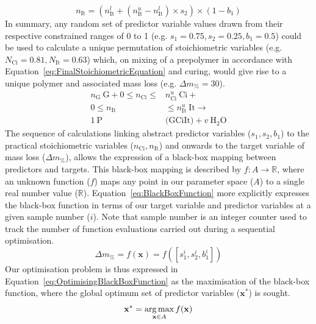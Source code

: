 \begin{equation}\label{eq:ItaconicAcidStoichiometricPredictorLink}
    n_{\text{It}}=(n_{\text{It}}^{l}+(n_{\text{It}}^{u}-n_{\text{It}}^{l})\times s_{2})\times (1-b_{1})
\end{equation}
In summary, any random set of predictor variable values drawn from their
 respective constrained ranges of 0 to 1
 (e.g. \(s_{1}=0.75,s_{2}=0.25,b_{1}=0.5\)) could be used to calculate a
 unique permutation of stoichiometric variables (e.g. 
 \(N_{\text{Ci}}=0.81,N_{\text{It}}=0.63\)) which, on mixing of a prepolymer in
 accordance with Equation~\ref{eq:FinalStoichiometricEquation} and curing,
 would give rise to a unique polymer and associated mass loss
 (e.g. \(\Delta m_{\%}=30\)).
\begin{equation}\label{eq:FinalStoichiometricEquation}
    \begin{split}
        n_{\text{G}}~\text{G}+0\leq n_{\text{Ci}}\leq& n_{\text{Ci}}^{u}~\text{Ci}+\\
        0\leq n_{\text{It}}&\leq n_{\text{It}}^{u}~\text{It}\rightarrow \\
        1~\text{P}&\text{(GCiIt)}+v~\text{H}_{2}\text{O}
    \end{split}
\end{equation}
The sequence of calculations linking abstract predictor variables 
 (\(s_{1},s_{2},b_{1}\)) to the practical stoichiometric variables 
 (\(n_{\text{Ci}},n_{\text{It}}\)) and onwards to the target variable of mass loss 
 (\(\Delta m_{\%}\)), allows the expression of a black-box mapping between 
 predictors and targets.
This black-box mapping is described by \(f:A\rightarrow \mathbb{R}\),
 where an unknown function (\(f\)) maps any point in our parameter space 
 (\(A\)) to a single real number value (\(\mathbb{R}\)).
Equation~\ref{eq:BlackBoxFunction} more explicitly expresses the black-box 
 function in terms of our target variable and predictor variables at a 
 given sample number (\(i\)).
Note that sample number is an integer counter used to track the number of
 function evaluations carried out during a sequential optimisation.
\begin{equation}\label{eq:BlackBoxFunction}
    \Delta m_{\%}=f(\mathbf{x})=f([s_{1}^{i},s_{2}^{i},b_{1}^{i}])
\end{equation}
Our optimisation problem is thus expressed in 
 Equation~\ref{eq:OptimisingBlackBoxFunction} as the maximisation of the 
 black-box function, where the global optimum set of predictor variables 
 (\(\mathbf{x}^{*}\)) is sought.
\begin{equation}\label{eq:OptimisingBlackBoxFunction}
    \mathbf{x}^{*}=\operatorname*{arg\,max}_{\mathbf{x}\in A} f(\mathbf{x})
\end{equation}
